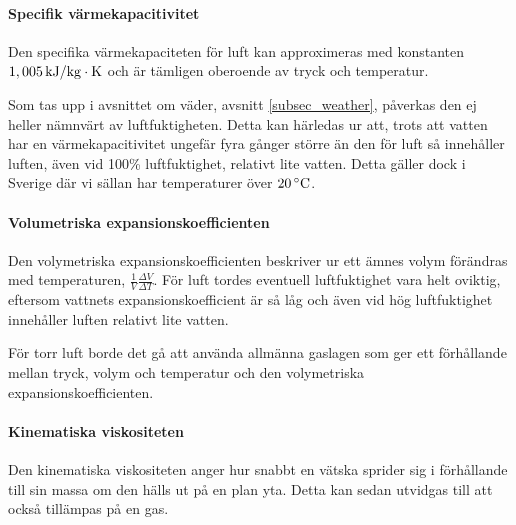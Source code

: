 
\paragraph{Specifik värmekapacitivitet}
Den specifika värmekapaciteten för luft kan approximeras med konstanten $\unit[1,005]{kJ/kg\cdot K}$ och är tämligen oberoende av tryck och temperatur.\cite{engineeringtoolbox}

Som tas upp i avsnittet om väder, avsnitt \ref{subsec_weather}, påverkas den ej heller nämnvärt av luftfuktigheten. Detta kan härledas ur att, trots att vatten har en värmekapacitivitet ungefär fyra gånger större än den för luft så innehåller luften, även vid 100\% luftfuktighet, relativt lite vatten. Detta gäller dock i Sverige där vi sällan har temperaturer över $\unit[20]{^\circ C}$.


\paragraph{Volumetriska expansionskoefficienten} %
Den volymetriska expansionskoefficienten beskriver ur ett ämnes volym förändras med temperaturen, $\frac{1}{V}\frac{\Delta V}{\Delta T}$. För luft tordes eventuell luftfuktighet vara helt oviktig, eftersom vattnets expansionskoefficient är så låg och även vid hög luftfuktighet innehåller luften relativt lite vatten.

För torr luft borde det gå att använda allmänna gaslagen som ger ett förhållande mellan tryck, volym och temperatur och den volymetriska expansionskoefficienten.%




\paragraph{Kinematiska viskositeten} %
Den kinematiska viskositeten anger hur snabbt en vätska sprider sig i förhållande till sin massa om den hälls ut på en plan yta. Detta kan sedan utvidgas till att också tillämpas på en gas.

